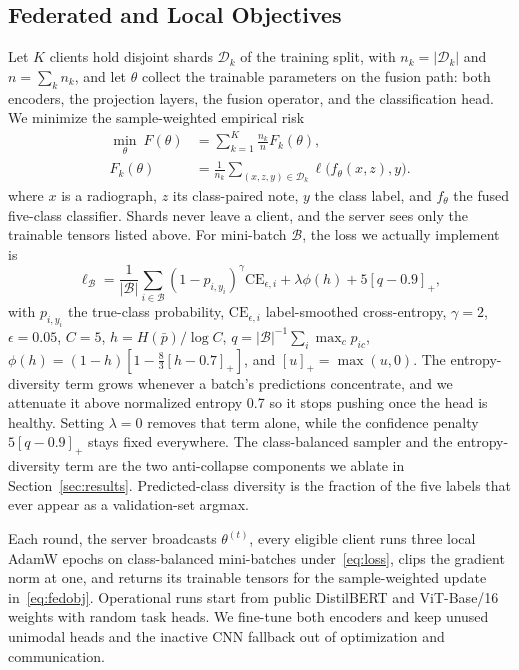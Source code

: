 \documentclass[letterpaper, conference]{IEEEtran}
\begin{document}
\subsection{Federated and Local Objectives}
\label{sec:objective}
Let $K$ clients hold disjoint shards $\mathcal{D}_k$ of the training split, with
$n_k=|\mathcal{D}_k|$ and $n=\sum_k n_k$, and let $\theta$ collect the trainable
parameters on the fusion path: both encoders, the projection layers, the fusion
operator, and the classification head. We minimize the sample-weighted empirical
risk
\begin{equation}
\begin{aligned}
\min_{\theta}\ F(\theta)&=\sum_{k=1}^{K}\frac{n_k}{n}F_k(\theta),\\[-2pt]
F_k(\theta)&=\frac{1}{n_k}\!\!\sum_{(x,z,y)\in\mathcal{D}_k}\!\!\ell\big(f_\theta(x,z),y\big).
\end{aligned}
\label{eq:fedobj}
\end{equation}
where $x$ is a radiograph, $z$ its class-paired note, $y$ the class label, and
$f_\theta$ the fused five-class classifier. Shards never leave a client, and the
server sees only the trainable tensors listed above. For mini-batch
$\mathcal{B}$, the loss we actually implement is
\begin{equation}
\ell_{\mathcal B}=\frac{1}{|\mathcal B|}\sum_{i\in\mathcal B}
(1-p_{i,y_i})^{\gamma}\mathrm{CE}_{\epsilon,i}
+\lambda\phi(h)+5[q-0.9]_+,
\label{eq:loss}
\end{equation}
with $p_{i,y_i}$ the true-class probability, $\mathrm{CE}_{\epsilon,i}$
label-smoothed cross-entropy, $\gamma{=}2$, $\epsilon{=}0.05$, $C{=}5$,
$h=H(\bar p)/\log C$, $q=|\mathcal B|^{-1}\sum_i\max_c p_{ic}$,
$\phi(h)=(1-h)[1-\tfrac{8}{3}[h-0.7]_+]$, and $[u]_+=\max(u,0)$.
The entropy-diversity term grows whenever a batch's predictions concentrate, and we
attenuate it above normalized entropy 0.7 so it stops pushing once the head is
healthy. Setting $\lambda{=}0$ removes that term alone, while the confidence
penalty $5[q-0.9]_+$ stays fixed everywhere. The class-balanced sampler and the
entropy-diversity term are the two anti-collapse components we ablate in
Section~\ref{sec:results}. Predicted-class diversity is the fraction of the five
labels that ever appear as a validation-set argmax.

Each round, the server broadcasts $\theta^{(t)}$, every eligible client runs three
local AdamW epochs on class-balanced mini-batches under~\eqref{eq:loss}, clips the
gradient norm at one, and returns its trainable tensors for the sample-weighted
update in~\eqref{eq:fedobj}. Operational runs start from public DistilBERT and
ViT-Base/16 weights with random task heads. We fine-tune both encoders and keep
unused unimodal heads and the inactive CNN fallback out of optimization and
communication.
\end{document}
